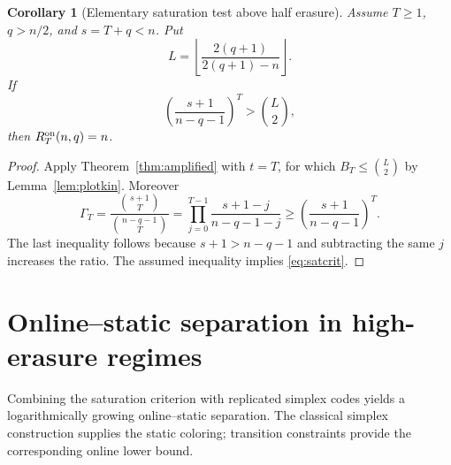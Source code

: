 \documentclass[11pt,a4paper]{article}
\newtheorem{corollary}[theorem]{Corollary}
\begin{document}
\begin{corollary}[Elementary saturation test above half erasure]\label{cor:highhalf}
Assume $T\ge1$, $q>n/2$, and $s=T+q<n$. Put
\[
 L=\left\lfloor\frac{2(q+1)}{2(q+1)-n}\right\rfloor.
\]
If
\begin{equation}\label{eq:easycrit}
 \left(\frac{s+1}{n-q-1}\right)^T>\binom L2,
\end{equation}
then $R_T^{\rm on}(n,q)=n$.
\end{corollary}
\begin{proof}
Apply Theorem~\ref{thm:amplified} with $t=T$, for which $B_T\le\binom L2$ by Lemma~\ref{lem:plotkin}. Moreover
\[
 \Gamma_T=\frac{\binom{s+1}T}{\binom{n-q-1}T}
 =\prod_{j=0}^{T-1}\frac{s+1-j}{n-q-1-j}
 \ge\left(\frac{s+1}{n-q-1}\right)^T.
\]
The last inequality follows because $s+1>n-q-1$ and subtracting the same $j$ increases the ratio. The assumed inequality implies \eqref{eq:satcrit}.
\end{proof}

\section{Online--static separation in high-erasure regimes}\label{sec:loggap}
Combining the saturation criterion with replicated simplex codes yields a logarithmically growing online--static separation. The classical simplex construction supplies the static coloring; transition constraints provide the corresponding online lower bound.
\end{document}
